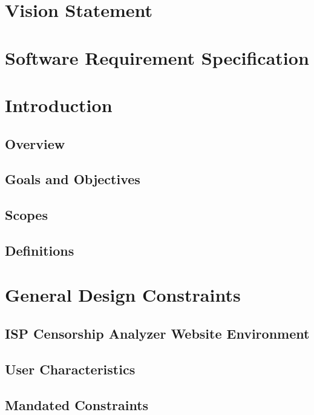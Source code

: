 \documentclass[12pt]{article}
\begin{document}

%


\section{Vision Statement}
\section{Software Requirement Specification}
\section{Introduction}
\subsection{Overview}
\subsection{Goals and Objectives}
\subsection{Scopes}
\subsection{Definitions}


\section{General Design Constraints}
\subsection{ISP Censorship Analyzer Website Environment}
\subsection{User Characteristics}
\subsection{Mandated Constraints}
\end{document}
